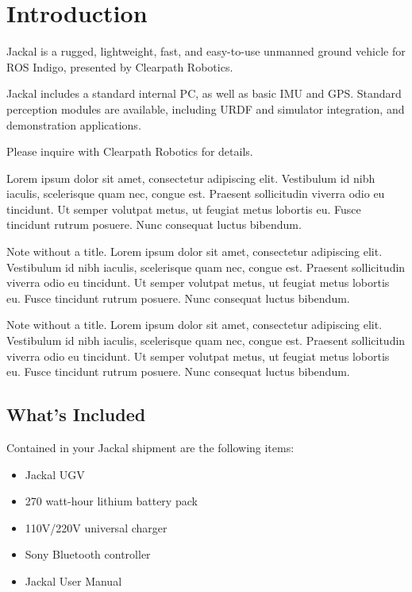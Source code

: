 \documentclass[]{clearpath-manual}
\begin{document}
\tableofcontents

\section{Introduction}

Jackal is a rugged, lightweight, fast, and easy-to-use unmanned ground vehicle for ROS
Indigo, presented by Clearpath Robotics.

Jackal includes a standard internal PC, as well as basic IMU and GPS. Standard
perception modules are available, including URDF and simulator integration, and
demonstration applications.

Please inquire with Clearpath Robotics for details.

\begin{note}
Lorem ipsum dolor sit amet, consectetur adipiscing elit. Vestibulum id
nibh iaculis, scelerisque quam nec, congue est. Praesent sollicitudin viverra odio
eu tincidunt. Ut semper volutpat metus, ut feugiat metus lobortis eu. Fusce tincidunt
rutrum posuere. Nunc consequat luctus bibendum.
\end{note}

\begin{note}
Note without a title. Lorem ipsum dolor sit amet, consectetur adipiscing elit. Vestibulum id
nibh iaculis, scelerisque quam nec, congue est. Praesent sollicitudin viverra odio
eu tincidunt. Ut semper volutpat metus, ut feugiat metus lobortis eu. Fusce tincidunt
rutrum posuere. Nunc consequat luctus bibendum.
\end{note}

\begin{warning}
Note without a title. Lorem ipsum dolor sit amet, consectetur adipiscing elit. Vestibulum id
nibh iaculis, scelerisque quam nec, congue est. Praesent sollicitudin viverra odio
eu tincidunt. Ut semper volutpat metus, ut feugiat metus lobortis eu. Fusce tincidunt
rutrum posuere. Nunc consequat luctus bibendum.
\end{warning}

\subsection{What's Included}

Contained in your Jackal shipment are the following items:

\begin{itemize}
  \item Jackal UGV
  \item 270 watt-hour lithium battery pack
  \item 110V/220V universal charger
  \item Sony Bluetooth controller
  \item Jackal User Manual
\end{itemize}
\end{document}
